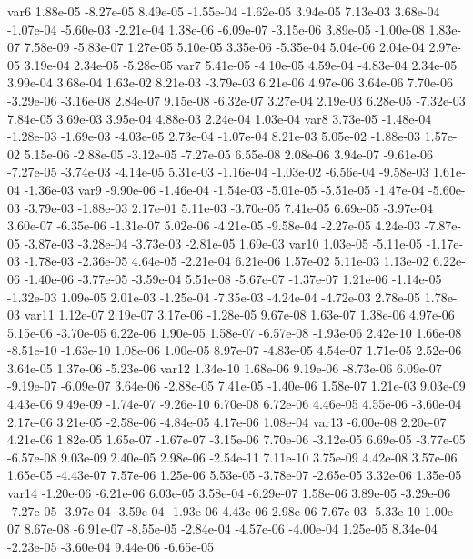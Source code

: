 var6  1.88e-05 -8.27e-05  8.49e-05 -1.55e-04 -1.62e-05  3.94e-05  7.13e-03  3.68e-04 -1.07e-04 -5.60e-03 -2.21e-04  1.38e-06 -6.09e-07 -3.15e-06  3.89e-05 -1.00e-08  1.83e-07  7.58e-09 -5.83e-07  1.27e-05  5.10e-05  3.35e-06 -5.35e-04  5.04e-06  2.04e-04  2.97e-05  3.19e-04  2.34e-05 -5.28e-05
var7  5.41e-05 -4.10e-05  4.59e-04 -4.83e-04  2.34e-05  3.99e-04  3.68e-04  1.63e-02  8.21e-03 -3.79e-03  6.21e-06  4.97e-06  3.64e-06  7.70e-06 -3.29e-06 -3.16e-08  2.84e-07  9.15e-08 -6.32e-07  3.27e-04  2.19e-03  6.28e-05 -7.32e-03  7.84e-05  3.69e-03  3.95e-04  4.88e-03  2.24e-04  1.03e-04
var8  3.73e-05 -1.48e-04 -1.28e-03 -1.69e-03 -4.03e-05  2.73e-04 -1.07e-04  8.21e-03  5.05e-02 -1.88e-03  1.57e-02  5.15e-06 -2.88e-05 -3.12e-05 -7.27e-05  6.55e-08  2.08e-06  3.94e-07 -9.61e-06 -7.27e-05 -3.74e-03 -4.14e-05  5.31e-03 -1.16e-04 -1.03e-02 -6.56e-04 -9.58e-03  1.61e-04 -1.36e-03
var9 -9.90e-06 -1.46e-04 -1.54e-03 -5.01e-05 -5.51e-05 -1.47e-04 -5.60e-03 -3.79e-03 -1.88e-03  2.17e-01  5.11e-03 -3.70e-05  7.41e-05  6.69e-05 -3.97e-04  3.60e-07 -6.35e-06 -1.31e-07  5.02e-06 -4.21e-05 -9.58e-04 -2.27e-05  4.24e-03 -7.87e-05 -3.87e-03 -3.28e-04 -3.73e-03 -2.81e-05  1.69e-03
var10  1.03e-05 -5.11e-05 -1.17e-03 -1.78e-03 -2.36e-05  4.64e-05 -2.21e-04  6.21e-06  1.57e-02  5.11e-03  1.13e-02  6.22e-06 -1.40e-06 -3.77e-05 -3.59e-04  5.51e-08 -5.67e-07 -1.37e-07  1.21e-06 -1.14e-05 -1.32e-03  1.09e-05  2.01e-03 -1.25e-04 -7.35e-03 -4.24e-04 -4.72e-03  2.78e-05  1.78e-03
var11  1.12e-07  2.19e-07  3.17e-06 -1.28e-05  9.67e-08  1.63e-07  1.38e-06  4.97e-06  5.15e-06 -3.70e-05  6.22e-06  1.90e-05  1.58e-07 -6.57e-08 -1.93e-06  2.42e-10  1.66e-08 -8.51e-10 -1.63e-10  1.08e-06  1.00e-05  8.97e-07 -4.83e-05  4.54e-07  1.71e-05  2.52e-06  3.64e-05  1.37e-06 -5.23e-06
var12  1.34e-10  1.68e-06  9.19e-06 -8.73e-06  6.09e-07 -9.19e-07 -6.09e-07  3.64e-06 -2.88e-05  7.41e-05 -1.40e-06  1.58e-07  1.21e-03  9.03e-09  4.43e-06  9.49e-09 -1.74e-07 -9.26e-10  6.70e-08  6.72e-06  4.46e-05  4.55e-06 -3.60e-04  2.17e-06  3.21e-05 -2.58e-06 -4.84e-05  4.17e-06  1.08e-04
var13 -6.00e-08  2.20e-07  4.21e-06  1.82e-05  1.65e-07 -1.67e-07 -3.15e-06  7.70e-06 -3.12e-05  6.69e-05 -3.77e-05 -6.57e-08  9.03e-09  2.40e-05  2.98e-06 -2.54e-11  7.11e-10  3.75e-09  4.42e-08  3.57e-06  1.65e-05 -4.43e-07  7.57e-06  1.25e-06  5.53e-05 -3.78e-07 -2.65e-05  3.32e-06  1.35e-05
var14 -1.20e-06 -6.21e-06  6.03e-05  3.58e-04 -6.29e-07  1.58e-06  3.89e-05 -3.29e-06 -7.27e-05 -3.97e-04 -3.59e-04 -1.93e-06  4.43e-06  2.98e-06  7.67e-03 -5.33e-10  1.00e-07  8.67e-08 -6.91e-07 -8.55e-05 -2.84e-04 -4.57e-06 -4.00e-04  1.25e-05  8.34e-04 -2.23e-05 -3.60e-04  9.44e-06 -6.65e-05
